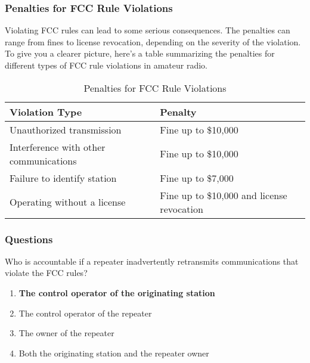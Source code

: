 
\subsubsection*{Penalties for FCC Rule Violations}
Violating FCC rules can lead to some serious consequences. The penalties can range from fines to license revocation, depending on the severity of the violation. To give you a clearer picture, here's a table summarizing the penalties for different types of FCC rule violations in amateur radio.

\begin{table}[h]
    \centering
    \caption{Penalties for FCC Rule Violations}
    \label{tab:fcc-violation-penalties}
    \begin{tabular}{|l|l|}
        \hline
        \textbf{Violation Type} & \textbf{Penalty} \\
        \hline
        Unauthorized transmission & Fine up to \$10,000 \\
        Interference with other communications & Fine up to \$10,000 \\
        Failure to identify station & Fine up to \$7,000 \\
        Operating without a license & Fine up to \$10,000 and license revocation \\
        \hline
    \end{tabular}
\end{table}

\subsubsection*{Questions}

\begin{tcolorbox}[colback=gray!10!white,colframe=black!75!black,title={T1F10}]
    Who is accountable if a repeater inadvertently retransmits communications that violate the FCC rules?
    \begin{enumerate}[label=\Alph*),noitemsep]
        \item \textbf{The control operator of the originating station}
        \item The control operator of the repeater
        \item The owner of the repeater
        \item Both the originating station and the repeater owner
    \end{enumerate}
\end{tcolorbox}

